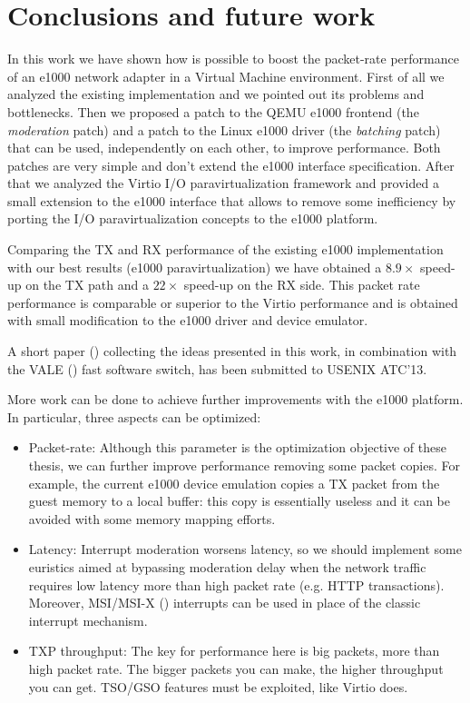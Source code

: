 \chapter{Conclusions and future work}
In this work we have shown how is possible to boost the packet-rate performance of an e1000 network adapter in a Virtual
Machine environment.
First of all we analyzed the existing implementation and we pointed out its problems and bottlenecks.
Then we proposed a patch to the QEMU e1000 frontend (the \emph{moderation} patch) and a patch to the Linux e1000 driver (the \emph{batching}
patch) that can be used, independently on each other, to improve performance. Both patches are very simple and don't extend the e1000
interface specification.
After that we analyzed the Virtio I/O paravirtualization framework and provided a small extension to the e1000 interface that allows to remove
some inefficiency by porting the I/O paravirtualization concepts to the e1000 platform.

\vspace{0.5cm}

Comparing the TX and RX performance of the existing e1000 implementation with our best results (e1000 paravirtualization) we have obtained
a $8.9 \times$ speed-up on the TX path and a $22 \times$ speed-up on the RX side.
This packet rate performance is comparable or superior to the Virtio performance and is obtained with small modification to the e1000
driver and device emulator.

A short paper (\cite{ref:e1000-opt}) collecting the ideas presented in this work, in combination with the VALE (\cite{ref:vale}) fast 
software switch, has been submitted to USENIX ATC'13.

\vspace{0.5cm}

More work can be done to achieve further improvements with the e1000 platform. In particular, three aspects can be optimized:
\begin{itemize}
  \item Packet-rate: Although this parameter is the optimization objective of these thesis, we can further improve performance removing
	some packet copies. For example, the current e1000 device emulation copies a TX packet from the guest memory to a local buffer: this
	copy is essentially useless and it can be avoided with some memory mapping efforts.
	
  \item Latency: Interrupt moderation worsens latency, so we should implement some euristics aimed at bypassing moderation delay
	when the network traffic requires low latency more than high packet rate (e.g. HTTP transactions).
	Moreover, MSI/MSI-X (\cite{ref:msi}) interrupts can be used in place of the classic interrupt mechanism.
	
  \item TXP throughput: The key for performance here is big packets, more than high packet rate. The bigger packets you can make, the
	higher throughput you can get. TSO/GSO features must be exploited, like Virtio does.
\end{itemize}
